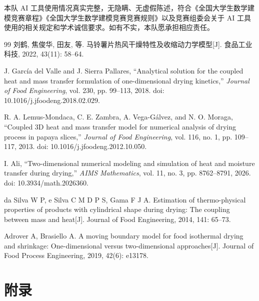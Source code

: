\documentclass[12pt,a4paper]{article}
\begin{document}
本队 AI 工具使用情况真实完整，无隐瞒、无虚假陈述，符合《全国大学生数学建模竞赛章程》《全国大学生数学建模竞赛竞赛规则》以及竞赛组委会关于 AI 工具使用的相关规定和学术诚信要求。如有不实，本队愿承担相应责任。


\begin{thebibliography}{99}
刘鹤, 焦俊华, 田友, 等. 马铃薯片热风干燥特性及收缩动力学模型[J].
食品工业科技, 2022, 43(11): 58--64.

J. García del Valle and J. Sierra Pallares,
``Analytical solution for the coupled heat and mass transfer formulation of one-dimensional drying kinetics,''
\textit{Journal of Food Engineering},
vol. 230, pp. 99--113, 2018.
doi: 10.1016/j.jfoodeng.2018.02.029.

R. A. Lemus-Mondaca, C. E. Zambra, A. Vega-Gálvez, and N. O. Moraga,
``Coupled 3D heat and mass transfer model for numerical analysis of drying process in papaya slices,''
\textit{Journal of Food Engineering},
vol. 116, no. 1, pp. 109--117, 2013.
doi: 10.1016/j.jfoodeng.2012.10.050.

I. Ali,
``Two-dimensional numerical modeling and simulation of heat and moisture transfer during drying,''
\textit{AIMS Mathematics},
vol. 11, no. 3, pp. 8762--8791, 2026.
doi: 10.3934/math.2026360.

da Silva W P, e Silva C M D P S, Gama F J A. Estimation of thermo-physical
properties of products with cylindrical shape during drying: The coupling
between mass and heat[J]. Journal of Food Engineering, 2014, 141: 65--73.

Adrover A, Brasiello A. A moving boundary model for food isothermal drying
and shrinkage: One-dimensional versus two-dimensional approaches[J].
Journal of Food Process Engineering, 2019, 42(6): e13178.

\end{thebibliography}

	
	
	


	
	\clearpage
	\appendix
	\section*{附录}
\end{document}

